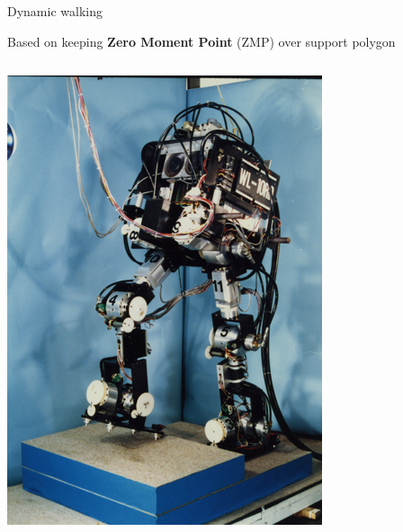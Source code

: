 \documentclass[compress]{beamer}
\begin{document}
\begin{frame}{Dynamic walking}

    Based on keeping \textbf{Zero Moment Point} (ZMP) over support polygon

    \begin{columns}
        \begin{column}{0.5\linewidth}

            \begin{center}
                \includegraphics[height=0.5\paperheight]{image46}


\end{center}
\end{column}
\end{columns}
\end{frame}
\end{document}
